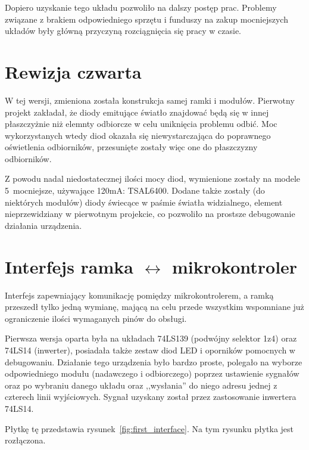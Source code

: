 Dopiero uzyskanie tego układu pozwoliło na dalszy postęp prac. Problemy związane z brakiem odpowiedniego sprzętu i funduszy na zakup mocniejszych układów były główną przyczyną rozciągnięcia się pracy w czasie.\\

\section{Rewizja czwarta}

W tej wersji, zmieniona została konstrukcja samej ramki i modułów. Pierwotny projekt zakładał, że diody emitujące światło znajdować będą się w innej płaszczyżnie niż elemnty odbiorcze w celu uniknięcia problemu odbić. Moc wykorzystanych wtedy diod okazała się niewystarczająca do poprawnego oświetlenia odbiorników, przesunięte zostały więc one do płaszczyzny odbiorników.

Z powodu nadal niedostatecznej ilości mocy diod, wymienione zostały na modele 5\texttimes\  mocniejsze, używające 120mA: TSAL6400. Dodane także zostały (do niektórych modułów) diody świecące w paśmie światła widzialnego, element nieprzewidziany w pierwotnym projekcie, co pozwoliło na prostsze debugowanie działania urządzenia.\\

\section{Interfejs ramka $\leftrightarrow$ mikrokontroler}

Interfejs zapewniający komunikację pomiędzy mikrokontrolerem, a ramką przeszedł tylko jedną wymianę, mającą na celu przede wszystkim wspomniane już ograniczenie ilości wymaganych pinów do obsługi.

Pierwsza wersja oparta była na układach 74LS139 (podwójny selektor 1\ppauza{}z\ppauza{}4) oraz 74LS14 (inwerter), posiadała także zestaw diod LED i oporników pomocnych w debugowaniu. Działanie tego urządzenia było bardzo proste, polegało na wyborze odpowiedniego modułu (nadawczego i odbiorczego) poprzez ustawienie sygnałów  oraz  po wybraniu danego układu oraz ,,wysłania'' do niego adresu jednej z czterech linii wyjściowych. Sygnał  uzyskany został przez zastosowanie inwertera 74LS14.

Płytkę tę przedstawia rysunek~\ref{fig:first_interface}.
Na tym rysunku płytka jest rozłączona.\\

